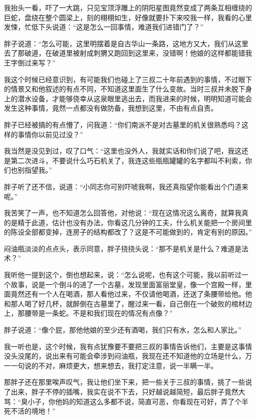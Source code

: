 我抬头一看，吓了一大跳，只见宝顶浮雕上的阴阳星图竟然变成了两条互相缠绕的巨蛇，盘绕在整个圆梁上，刻的栩栩如生，好像就要扑下来咬我一样，我看的心里发悚，忙低下头说道：“这是怎么一回事情，难道我们进错门了？”

胖子说道：“怎么可能，这里明摆着是自古华山一条路，这地方又大，我们从这里去了那破道，在破道里被射成刺猬又跑回到这里来，没错啊！他娘的这样都能错我王字倒过来写？”

我这个时候已经意识到，有可能我们也碰上了三叔二十年前遇到的事情，不过眼下的情景又和他叙述的有点不同，不知道这里面生了什么变故。当时三叔并未脱下身上的潜水设备，才能够侥幸从这泉眼里逃出去，而我进来的时候，明明知道可能会发生这种事情，竟然一点都没有做防备，我想到这里，不由有点自责。

胖子已经被搞的有点懵了，问我道：“你们南派不是对古墓里的机关很熟悉吗？这样的事情你以前见过没？”

我当然是没见到过，叹了口气：“这里也没外人，我就实话和你们说了吧，我这还是第二次进斗，不要说什么巧石机关了，我连这些瓶瓶罐罐的名字都叫不利索，你们也别指望我。”

胖子听了还不信，说道：“小同志你可别吓唬我啊，我还真指望你能看出个门道来呢。”

我苦笑了一声，也不知道怎么回答他，对他说：“现在这情况这么离奇，就算我真的是精于此道，估计也没有办法，你看这几分钟的工夫，什么机关能把一个房间里的陈设全部都变掉，连房子的结构都改了？这是不可能做到的，肯定有别的原因。”

闷油瓶淡淡的点点头，表示同意，胖子挠挠头说：“那不是机关是什么？难道是法术？”

我听他一提到这个，倒也想起来，说：“怎么说呢，也有这个可能，我以前听过一个故事，说是一个倒斗的进了一个古墓，发现里面富丽堂皇，像一个宫殿一样，里面竟然还有一个人在喝酒，那人看他过来，不仅请他喝酒，还送了条腰带给他。他和那人喝了好几杯，就醉倒在古墓里了，醒过来一看，自己倒在一个破败的棺材边上，那腰带是一条蛇。不是和我们现在的情况有点像？”

胖子说道：“像个屁，那他他娘的至少还有酒喝，我们只有水，怎么和人家比。”

我一听也是，这个时候，我有点犹豫要不要把三叔的事情告诉他们，主要是这事情没头没尾的，说出来有可能会牵涉到闷油瓶，我现在还不知道他的立场是什么，万一一句说的不对，麻烦更大，想来想去，我打定注意，说一半瞒一半。

那胖子还在那里唉声叹气，我让他们坐下来，把一些关于三叔的事情，挑了一些说了出来，胖子不停的插嘴，我实在说不下去，只好越说越简短，最后胖子竟然大骂：“臭小子，你他妈的知道这么多都不说，简直可恶，你看现在可好，弄了个半死不活的境地！”

